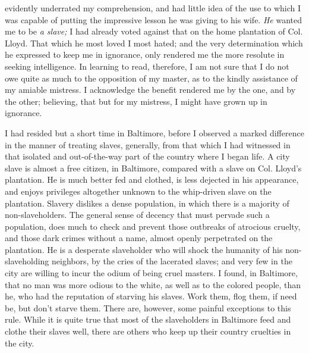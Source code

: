 evidently underrated my comprehension, and had little idea of the use to
which I was capable of putting the impressive lesson he was giving to
his wife. \emph{He} wanted me to be \emph{a slave;} I had already voted
against that on the home plantation of Col. Lloyd. That which he most
loved I most hated; and the very determination which he expressed to
keep me in ignorance, only rendered me the more resolute in seeking
intelligence. In learning to read, therefore, I am not sure that I do
not owe quite as much to the opposition of my master, as to the kindly
assistance of my amiable mistress. I acknowledge the benefit rendered me
by the one, and by the other; believing, that but for my mistress, I
might have grown up in ignorance.

I had resided but a short time in Baltimore, before I observed a marked
difference in the manner of treating slaves, generally, from that which
I had witnessed in that isolated and out-of-the-way part of the country
where I began life. A city slave is almost a free citizen, in Baltimore,
compared with a slave on Col. Lloyd's plantation. He is much better fed
and clothed, is less dejected in his appearance, and enjoys privileges
altogether unknown to the whip-driven slave on the plantation. Slavery
dislikes a dense {\protect\hypertarget{148}{}{}}population, in which
there is a majority of non-slaveholders. The general sense of decency
that must pervade such a population, does much to check and prevent
those outbreaks of atrocious cruelty, and those dark crimes without a
name, almost openly perpetrated on the plantation. He is a desperate
slaveholder who will shock the humanity of his non-slaveholding
neighbors, by the cries of the lacerated slaves; and very few in the
city are willing to incur the odium of being cruel masters. I found, in
Baltimore, that no man was more odious to the white, as well as to the
colored people, than he, who had the reputation of starving his slaves.
Work them, flog them, if need be, but don't starve them. There are,
however, some painful exceptions to this rule. While it is quite true
that most of the slaveholders in Baltimore feed and clothe their slaves
well, there are others who keep up their country cruelties in the city.

